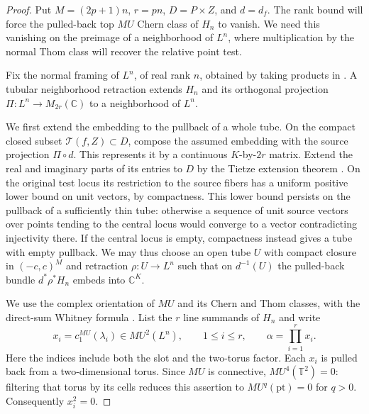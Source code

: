 \begin{proof}
Put $M=(2p+1)n$, $r=pn$, $D=P\times Z$, and $d=d_f$.
The rank bound will force the pulled-back top $MU$ Chern class of $H_n$
to vanish.  We need this vanishing on the preimage of a neighborhood
of $L^n$, where multiplication by the normal Thom class will recover
the relative point test.

Fix the normal framing of $L^n$, of real rank $n$, obtained by
taking products in .  A tubular neighborhood
retraction extends $H_n$ and its orthogonal projection
$\Pi:L^n\to M_{2r}(\mathbb C)$ to a neighborhood of $L^n$.

We first extend the embedding to the pullback of a whole tube.
On the compact closed subset $\mathcal T(f,Z)\subset D$, compose
the assumed embedding with the source projection $\Pi\circ d$.
This represents it by a continuous $K$-by-$2r$ matrix.  Extend the
real and imaginary parts of its entries to $D$ by the Tietze
extension theorem \cite[Theorem~1.10.5]{Tao2010}.  On the original test locus its restriction to
the source fibers has a uniform positive lower bound on unit
vectors, by compactness.  This lower bound persists on the pullback
of a sufficiently thin tube: otherwise a sequence of unit source
vectors over points tending to the central locus would converge to
a vector contradicting injectivity there.  If the central locus is
empty, compactness instead gives a tube with empty pullback.
We may thus choose an open tube $U$ with compact closure in
$(-c,c)^M$ and retraction $\rho:U\to L^n$ such that on $d^{-1}(U)$
the pulled-back bundle $d^*\rho^*H_n$ embeds into $\mathbb C^K$.

We use the complex orientation of $MU$ and its Chern and Thom
classes, with the direct-sum Whitney formula
\cite[Lecture 5, Proposition 6 and the following discussion;
Lecture 6, Remark 7]{Lurie2010}.  List the $r$ line summands of
$H_n$ and write
\[
 x_i=c_1^{MU}(\lambda_i)\in MU^2(L^n),\qquad 1\le i\le r,
 \qquad \alpha=\prod_{i=1}^r x_i.
\]
Here the indices include both the slot and the two-torus factor.
Each $x_i$ is pulled back from a two-dimensional torus.  Since $MU$
is connective, $MU^4(\mathbb T^2)=0$: filtering that torus by its
cells reduces this assertion to $MU^q(\mathrm{pt})=0$ for $q>0$.
Consequently $x_i^2=0$.


\end{proof}

